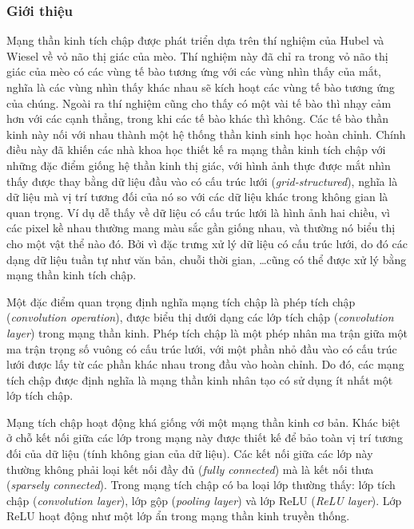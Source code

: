 \subsubsection{Giới thiệu}
Mạng thần kinh tích chập được phát triển dựa trên thí nghiệm của Hubel và Wiesel về vỏ não thị giác của mèo. Thí nghiệm này đã chỉ ra trong vỏ não thị giác của mèo có các vùng tế bào tương ứng với các vùng nhìn thấy của mắt, nghĩa là các vùng nhìn thấy khác nhau sẽ kích hoạt các vùng tế bào tương ứng của chúng. Ngoài ra thí nghiệm cũng cho thấy có một vài tế bào thì nhạy cảm hơn với các cạnh thẳng, trong khi các tế bào khác thì không. Các tế bào thần kinh này nối với nhau thành một hệ thống thần kinh sinh học hoàn chỉnh. Chính điều này đã khiến các nhà khoa học thiết kế ra mạng thần kinh tích chập với những đặc điểm giống hệ thần kinh thị giác, với hình ảnh thực được mắt nhìn thấy được thay bằng dữ liệu đầu vào có cấu trúc lưới (\textit{grid-structured}), nghĩa là dữ liệu mà vị trí tương đối của nó so với các dữ liệu khác trong không gian là quan trọng. Ví dụ dễ thấy về dữ liệu có cấu trúc lưới là hình ảnh hai chiều, vì các pixel kề nhau thường mang màu sắc gần giống nhau, và thường nó biểu thị cho một vật thể nào đó. Bởi vì đặc trưng xử lý dữ liệu có cấu trúc lưới, do đó các dạng dữ liệu tuần tự như văn bản, chuỗi thời gian, \dots cũng có thể được xử lý bằng mạng thần kinh tích chập.\cite{Aggarwal2023-zk}

Một đặc điểm quan trọng định nghĩa mạng tích chập là phép tích chập (\textit{convolution operation}), được biểu thị dưới dạng các lớp tích chập (\textit{convolution layer}) trong mạng thần kinh. Phép tích chập là một phép nhân ma trận giữa một ma trận trọng số vuông có cấu trúc lưới, với một phần nhỏ đầu vào có cấu trúc lưới được lấy từ các phần khác nhau trong đầu vào hoàn chỉnh. Do đó, các mạng tích chập được định nghĩa là mạng thần kinh nhân tạo có sử dụng ít nhất một lớp tích chập.

Mạng tích chập hoạt động khá giống với một mạng thần kinh cơ bản. Khác biệt ở chỗ kết nối giữa các lớp trong mạng này được thiết kế để bảo toàn vị trí tương đối của dữ liệu (tính không gian của dữ liệu). Các kết nối giữa các lớp này thường không phải loại kết nối đầy đủ (\textit{fully connected}) mà là kết nối thưa (\textit{sparsely connected}). Trong mạng tích chập có ba loại lớp thường thấy: lớp tích chập (\textit{convolution layer}), lớp gộp (\textit{pooling layer}) và lớp ReLU (\textit{ReLU layer}). Lớp ReLU hoạt động như một lớp ẩn trong mạng thần kinh truyền thống.

